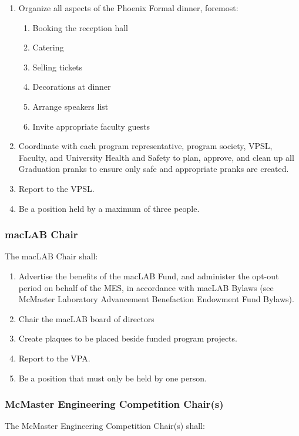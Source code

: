 \begin{enumerate}
 \item
  Organize all aspects of the Phoenix Formal dinner, foremost:

  \begin{enumerate}
   \item
    Booking the reception hall
   \item
    Catering
   \item
    Selling tickets
   \item
    Decorations at dinner
   \item
    Arrange speakers list
   \item
    Invite appropriate faculty guests
  \end{enumerate}
 \item
  Coordinate with each program representative, program society, VPSL, Faculty, and University Health and Safety to plan, approve, and clean up all Graduation pranks to ensure only safe and appropriate pranks are created.
 \item
  Report to the VPSL.
 \item
  Be a position held by a maximum of three people.

\end{enumerate}
\subsubsection{macLAB Chair}
\label{maclab-chair}

The macLAB Chair shall:

\begin{enumerate}
 \item
  Advertise the benefits of the macLAB Fund, and administer the opt-out period on behalf of the MES, in accordance with macLAB Bylaws (see McMaster Laboratory Advancement Benefaction Endowment Fund Bylaws).
 \item
  Chair the macLAB board of directors
 \item
  Create plaques to be placed beside funded program projects.
 \item
  Report to the VPA.
 \item
  Be a position that must only be held by one person.

\end{enumerate}

\subsubsection{McMaster Engineering Competition Chair(s)}
\label{mcmaster-engineering-competition-chairs}
The McMaster Engineering Competition Chair(s) shall:

